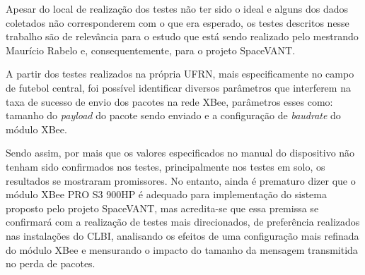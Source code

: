 \label{Cap:conclusao}

Apesar do local de realização dos testes não ter sido o ideal e alguns dos dados coletados não corresponderem com o que era esperado, os testes descritos nesse trabalho são de relevância para o estudo que está sendo realizado pelo mestrando Maurício Rabelo e, consequentemente, para o projeto SpaceVANT.

A partir dos testes realizados na própria UFRN, mais especificamente no campo de futebol central, foi possível identificar diversos parâmetros que interferem na taxa de sucesso de envio dos pacotes na rede XBee, parâmetros esses como: tamanho do \emph{payload} do pacote sendo enviado e a configuração de \emph{baudrate} do módulo XBee.

Sendo assim, por mais que os valores especificados no manual do dispositivo não tenham sido confirmados nos testes, principalmente nos testes em solo, os resultados se mostraram promissores. No entanto, ainda é prematuro dizer que o módulo XBee PRO S3 900HP é adequado para implementação do sistema proposto pelo projeto SpaceVANT, mas acredita-se que essa premissa se confirmará com a realização de testes mais direcionados, de preferência realizados nas instalações do CLBI, analisando os efeitos de uma configuração mais refinada do módulo XBee e mensurando o impacto do tamanho da mensagem transmitida no perda de pacotes.     

 